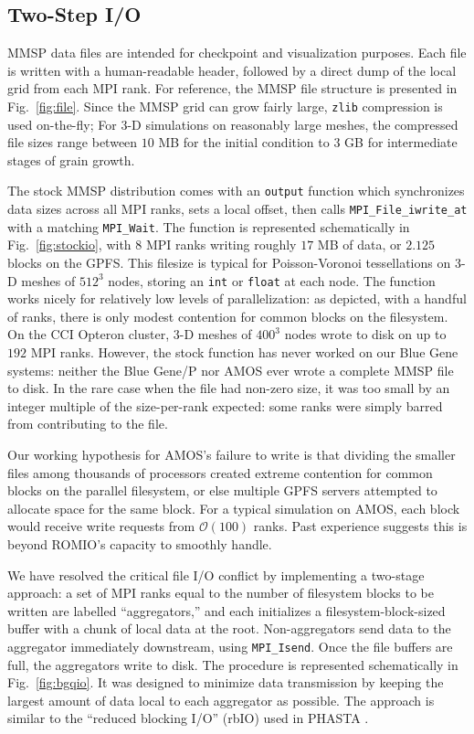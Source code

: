 \documentclass[11pt]{article}
\begin{document}
\begin{multicols*}{2}
\subsection*{Two-Step I/O}
MMSP data files are intended for checkpoint and visualization purposes.
Each file is written with a human-readable header, followed by a direct dump of the local grid from each MPI rank.
For reference, the MMSP file structure is presented in Fig.~\ref{fig:file}.
Since the MMSP grid can grow fairly large, \texttt{zlib} compression is used on-the-fly;
For 3-D simulations on reasonably large meshes, the compressed file sizes range between $10$ MB for the initial condition to $3$ GB for intermediate stages of grain growth.

The stock MMSP distribution comes with an \texttt{output} function which synchronizes data sizes across all MPI ranks, sets a local offset, then calls \texttt{MPI\_File\_iwrite\_at} with a matching \texttt{MPI\_Wait}.
The function is represented schematically in Fig.~\ref{fig:stockio}, with $8$ MPI ranks writing roughly $17$ MB of data, or $2.125$ blocks on the GPFS.
This filesize is typical for Poisson-Voronoi tessellations on 3-D meshes of $512^3$ nodes, storing an \texttt{int} or \texttt{float} at each node.
The function works nicely for relatively low levels of parallelization:
as depicted, with a handful of ranks, there is only modest contention for common blocks on the filesystem.
On the CCI Opteron cluster, 3-D meshes of $400^3$ nodes wrote to disk on up to $192$ MPI ranks.
However, the stock function has never worked on our Blue Gene systems:
neither the Blue Gene/P nor AMOS ever wrote a complete MMSP file to disk.
In the rare case when the file had non-zero size, it was too small by an integer multiple of the size-per-rank expected:
some ranks were simply barred from contributing to the file.

Our working hypothesis for AMOS's failure to write is that dividing the smaller files among thousands of processors created extreme contention for common blocks on the parallel filesystem, or else multiple GPFS servers attempted to allocate space for the same block.
For a typical simulation on AMOS, each block would receive write requests from $\mathcal{O}(100)$ ranks.
Past experience suggests this is beyond ROMIO's capacity to smoothly handle.

We have resolved the critical file I/O conflict by implementing a two-stage approach:
a set of MPI ranks equal to the number of filesystem blocks to be written are labelled ``aggregators,'' and each initializes a filesystem-block-sized buffer with a chunk of local data at the root.
Non-aggregators send data to the aggregator immediately downstream, using \texttt{MPI\_Isend}.
Once the file buffers are full, the aggregators write to disk.
The procedure is represented schematically in Fig.~\ref{fig:bgqio}.
It was designed to minimize data transmission by keeping the largest amount of data local to each aggregator as possible.
The approach is similar to the ``reduced blocking I/O'' (rbIO) used in PHASTA \cite{Carothers2010,Carothers2011}.



\end{multicols*}
\end{document}
